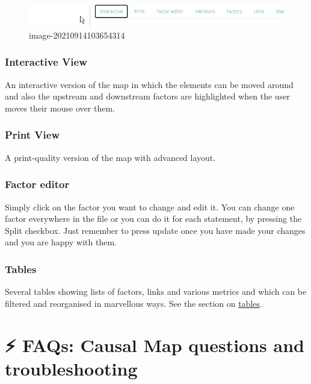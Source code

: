 \documentclass[
]{book}
\begin{document}
\begin{figure}
\centering
\includegraphics[width=6.77083in,height=\textheight]{_assets/image-20210914103654314.png}
\caption{image-20210914103654314}
\end{figure}

\hypertarget{not2}{%
\subsection{Interactive View}\label{not2}}

An interactive version of the map in which the elements can be moved around and also the upstream and downstream factors are highlighted when the user moves their mouse over them.

\hypertarget{not}{%
\subsection{Print View}\label{not}}

A print-quality version of the map with advanced layout.

\hypertarget{no-not-this-one}{%
\subsection{Factor editor}\label{no-not-this-one}}

Simply click on the factor you want to change and edit it. You can change one factor everywhere in the file or you can do it for each statement, by pressing the Split checkbox. Just remember to press update once you have made your changes and you are happy with them.

\hypertarget{tables}{%
\subsection{Tables}\label{tables}}

Several tables showing lists of factors, links and various metrics and which can be filtered and reorganised in marvellous ways. See the section on \href{https://guide.causalmap.app/all-the-tables.html}{tables}.

\hypertarget{FAQs}{%
\chapter{⚡ FAQs: Causal Map questions and troubleshooting}\label{FAQs}}
\end{document}
